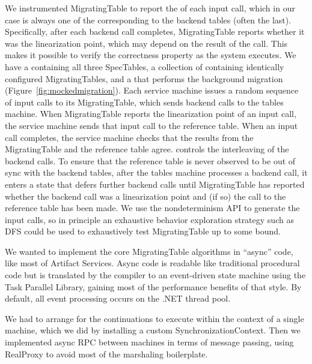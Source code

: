 We instrumented MigratingTable to report the  of each input call, which in our case is always one of the corresponding  to the backend tables (often the last).  Specifically, after each backend call completes, MigratingTable reports whether it was the linearization point, which may depend on the result of the call.  This makes it possible to verify the correctness property as the system executes.  We have a \psharp {} containing all three SpecTables, a collection of  containing identically configured MigratingTables, and a  that performs the background migration (Figure~\ref{fig:mockedmigration}).  Each service machine issues a random sequence of input calls to its MigratingTable, which sends backend calls to the tables machine.  When MigratingTable reports the linearization point of an input call, the service machine sends that input call to the reference table.  When an input call completes, the service machine checks that the results from the MigratingTable and the reference table agree.  \psharp controls the interleaving of the backend calls.  To ensure that the reference table is never observed to be out of sync with the backend tables, after the tables machine processes a backend call, it enters a state that defers further backend calls until MigratingTable has reported whether the backend call was a linearization point and (if so) the call to the reference table has been made.  We use the \psharp nondeterminism API to generate the input calls, so in principle an exhaustive \psharp behavior exploration strategy such as DFS could be used to exhaustively test MigratingTable up to some bound.

We wanted to implement the core MigratingTable algorithms in \csharp ``async'' code, like most of Artifact Services.  Async code is readable like traditional procedural code but is translated by the compiler to an event-driven state machine using the Task Parallel Library, gaining most of the performance benefits of that style.  By default, all event processing occurs on the .NET thread pool.

We had to arrange for the continuations to execute within the context of a single \psharp machine, which we did by installing a custom SynchronizationContext.  Then we implemented async RPC between machines in terms of message passing, using RealProxy to avoid most of the marshaling boilerplate.
